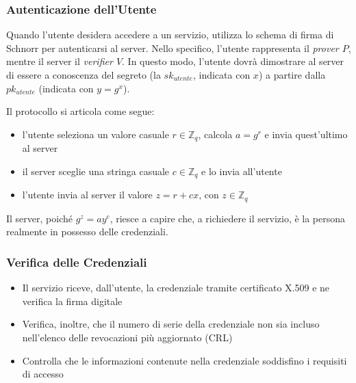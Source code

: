             \subsubsection{Autenticazione dell'Utente}
                Quando l'utente desidera accedere a un servizio, utilizza lo schema di firma di Schnorr per autenticarsi al server.
                Nello specifico, l'utente rappresenta il \textit{prover $P$}, mentre il server il \textit{verifier $V$}.
                In questo modo, l'utente dovrà dimostrare al server di essere a conoscenza del segreto (la $sk_{utente}$, indicata con $x$) a partire dalla $pk_{utente}$ (indicata con $y = g^x$).
                
                \noindent Il protocollo si articola come segue:

                \begin{itemize}
                    \item l'utente seleziona un valore casuale $r \in \mathbb{Z}_q$, calcola $a = g^r$ e invia quest'ultimo al server

                    \item il server sceglie una stringa casuale $c \in \mathbb{Z}_q$ e lo invia all'utente

                    \item l'utente invia al server il valore $z = r + cx$, con $z \in \mathbb{Z}_q$
                \end{itemize}

                \noindent Il server, poiché $g^z = a y^c$, riesce a capire che, a richiedere il servizio, è la persona realmente in possesso delle credenziali.
    
            \subsubsection{Verifica delle Credenziali}
                \begin{itemize}
                    \item Il servizio riceve, dall'utente, la credenziale tramite certificato X.509 e ne verifica la firma digitale

                    \item Verifica, inoltre, che il numero di serie della credenziale non sia incluso nell'elenco delle revocazioni più aggiornato (CRL)
    
                    \item Controlla che le informazioni contenute nella credenziale soddisfino i requisiti di accesso
                \end{itemize}
    
